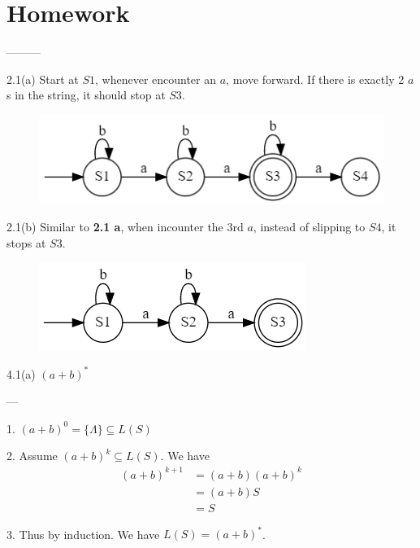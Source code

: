 \documentclass{article}
\begin{document}
\maketitle

\section{Homework}
\begin{tlist}{---------}

	\item[2.1(a)]
	Start at $S1$, whenever encounter an $a$, move forward. If there is exactly 2 $a$s in the string, it should stop at $S3$.
	\begin{figure}[H]\centering\includegraphics{2_1_a.png}\end{figure}

	\item[2.1(b)]
	Similar to {\bf 2.1 a}, when incounter the 3rd $a$, instead of slipping to $S4$, it stops at $S3$.
	\begin{figure}[H]\centering\includegraphics{2_1_b.png}\end{figure}

	\item[4.1(a)]
	$(a+b)^*$
	\begin{tlist}{---}
		\item[1.] $(a+b)^0=\{\Lambda\}\subseteq L(S)$
		\item[2.] Assume $(a+b)^k\subseteq L(S)$. We have
		\begin{align*}
			(a+b)^{k+1} & = (a+b)(a+b)^{k} \\
			            & = (a+b)S         \\
			            & = S
		\end{align*}
		\item[3.] Thus by induction. We have $L(S)=(a+b)^*$.
	\end{tlist}


\end{tlist}
\end{document}
